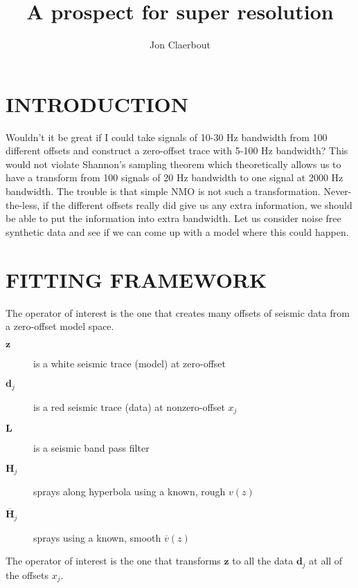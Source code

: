 
\title{
	A prospect for super resolution
        }
\author{Jon Claerbout}
\def\eq{\quad =\quad}
\maketitle

\section{INTRODUCTION}

Wouldn't it be great if I could take signals of
10-30 Hz bandwidth
from 100 different offsets and construct a zero-offset trace with 5-100 Hz
bandwidth?
This would not violate Shannon's sampling theorem
which theoretically allows us to have a transform
from 100 signals of 20 Hz bandwidth to one signal
at 2000 Hz bandwidth.
The trouble is that simple NMO is not such a transformation.
Never-the-less,
if the different offsets really did give us any extra information,
we should be able to put the information into extra bandwidth.
Let us consider noise free synthetic data and see
if we can come up with a model where this could happen.

\section{FITTING FRAMEWORK}

\par
The operator of interest is the one that creates many offsets
of seismic data from a zero-offset model space.
\begin{description}
\item [$\mathbf z$]
	is a white seismic trace (model) at zero-offset
\item [$\mathbf d_j$]
	is a red seismic trace (data) at nonzero-offset $x_j$
\item [$\mathbf L$]	is a seismic band pass filter
\item [$\mathbf H_j$]
			sprays along hyperbola
				using a known, rough  $v(z)$ 
\item [$\overline{\mathbf H}_j$]
			sprays 
				using a known, smooth $\overline{v}(z)$
\end{description}
The operator of interest is the one that transforms
$\mathbf z$ to all the data
$\mathbf d_j$
at all of the offsets $x_j$.


